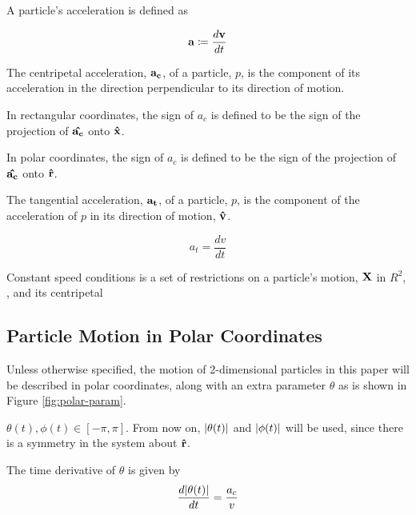 \begin{definition}
  A particle's acceleration is defined as 
  
  \[\mathbf{a} \coloneqq \frac{d\mathbf{v}}{dt}\]
\end{definition}

\begin{definition}
  The centripetal acceleration, $\mathbf{a_c}$, of a particle, $p$, is the component of its acceleration in the direction perpendicular to its direction of motion.

  In rectangular coordinates, the sign of $a_c$ is defined to be the sign of the projection of $\mathbf{\hat{a_c}}$ onto $\mathbf{\hat{x}}$. 

  In polar coordinates, the sign of $a_c$ is defined to be the sign of the projection of $\mathbf{\hat{a_c}}$ onto $\mathbf{\hat{r}}$.
\end{definition}

\begin{definition}
  The tangential acceleration, $\mathbf{a_t}$, of a particle, $p$, is the component of the acceleration of $p$ in its direction of motion, $\mathbf{\hat{v}}$.

  \[
  a_t = \frac{dv}{dt}
  \]
\end{definition}

\begin{definition}
  Constant speed conditions is a set of restrictions on a particle's motion, $\mathbf{X}$ in $R^2$, , and its centripetal 
\end{definition}


\subsection{Particle Motion in Polar Coordinates}

Unless otherwise specified, the motion of 2-dimensional particles in this paper will be described in polar coordinates, along with an extra parameter $\theta$ as is shown in Figure \ref{fig:polar-param}.


$\theta(t), \phi(t) \in [-\pi, \pi]$. From now on, $\abs{\theta(t)}$ and $\abs{\phi(t)}$ will be used, since there is a symmetry in the system about $\mathbf{\hat{r}}$.

\begin{lemma}
The time derivative of $\theta$ is given by
\[
\frac{d\abs{\theta(t)}}{dt} = \frac{a_c}{v}
\]
\end{lemma}


